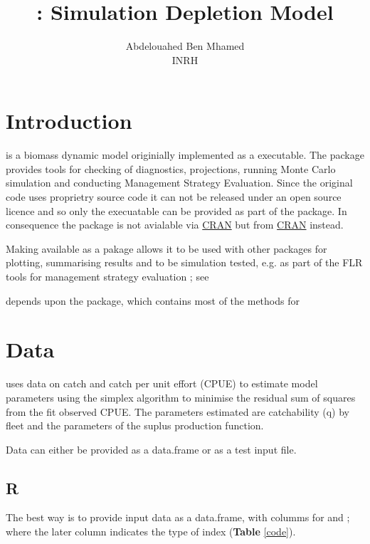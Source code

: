 \documentclass[shortnames,nojss,article]{jss}
\author{Abdelouahed Ben Mhamed\\INRH }
\title{\pkg{DEPLr}: Simulation Depletion Model}
\begin{document}
\newpage\tableofcontents\newpage

\section{Introduction}

 is a biomass dynamic model \citep{prager_suite_1994,prager_aspic-surplus-production_1992} originially implemented as a  executable.
The package provides tools for checking of diagnostics, projections, running Monte Carlo simulation and conducting Management Strategy Evaluation.
Since the original  code uses proprietry source code it can not be released under an open source licence and so only the
 execuatable can be provided as part of the package. In consequence the package is not avialable via \href{}{CRAN} but
from \href{}{CRAN} instead.

Making  available as a pakage allows it to be used with other packages for plotting, summarising results and to be simulation tested, e.g. 
as part of the FLR tools for management strategy evaluation \cite{kell_evaluation_1999}; see 
\citep{kell2013mpalbn,kell2013diagalbn,kell2013diagalbs,kell2013msealbn,kell2013msealbn,kell2013fwdalbn,kell2013diagswon,kell2013diagswos,kell2013fwdswon,kell2013profile,kell2013uncert}

 depends upon the \cite{biodyn} package, which contains most of the methods for  
\section{Data}

 uses data on catch and catch per unit effort (CPUE) to estimate model parameters using the simplex algorithm to minimise the residual 
sum of squares from the fit observed CPUE. The parameters estimated are catchability (q) by fleet and the parameters of the suplus production 
function. 

Data can either be provided as a data.frame or as a test input file. 

\subsection{R}

The best way is to provide input data as a data.frame, with columms for  and ; where the 
later column indicates the type of index (\textbf{Table} \ref{code}).
\end{document}
